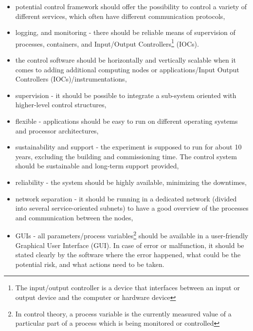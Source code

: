  
 \begin{itemize}
    \item potential control framework should offer the possibility to control a variety of different services, which often have different communication protocols,
    \item logging, and monitoring - there should be reliable means of supervision of processes, containers, and Input/Output Controllers\footnote{The input/output controller is a device that interfaces between an input or output device and the computer or hardware device} (\glspl{IOC}).
    \item the control software should be horizontally and vertically scalable when it comes to adding additional computing nodes or applications/Input Output Controllers (\glspl{IOC})/instrumentations,
    \item supervision - it should be possible to integrate a sub-system oriented with higher-level control structures,
     \item flexible - applications should be easy to run on different operating systems and processor architectures,
     \item sustainability and support - the experiment is supposed to run for about 10 years, excluding the building and commissioning time. The control system should be sustainable and long-term support provided,
     \item reliability - the system should be highly available, minimizing the downtimes,
     \item network separation - it should be running in a dedicated network (divided into several service-oriented subnets) to have a good overview of the processes and communication between the nodes,
     \item \glspl{GUI} - all parameters/process variables\footnote{In control theory, a process variable is the currently measured value of a particular part of a process which is being monitored or controlled} should be available in a user-friendly Graphical User Interface (\gls{GUI}). In case of error or malfunction, it should be stated clearly by the software where the error happened, what could be the potential risk, and what actions need to be taken.

 \end{itemize}
\newpage

